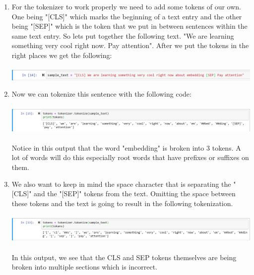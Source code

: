 \documentclass{article}
\begin{document}
\begin{enumerate}
    
    \item For the tokenizer to work properly we need to add some tokens of our own.  One being "[CLS]" which marks the beginning of a text entry and the other being "[SEP]" which is the token that we put in between sentences within the same text entry.  So lets put together the following text.  "We are learning something very cool right now. Pay attention". After we put the tokens in the right places we get the following:\\
    \vspace{.1cm}\\
    \includegraphics[scale = .7]{sample3.png}
    \vspace{.2cm}\\
    \item Now we can tokenize this sentence with the following code:\\
    \vspace{.1cm}\\
    \includegraphics[scale = .6]{tokenstep2.png}\\
    \vspace{.1cm}\\
    Notice in this output that the word "embedding" is broken into 3 tokens.  A lot of words will do this especially root words that have prefixes or suffixes on them.
    \vspace{.2cm}\\
    \item We also want to keep in mind the space character that is separating the "[CLS]" and the "[SEP]" tokens from the text. Omitting the space between these tokens and the text is going to result in the following tokenization.\\
    \vspace{.1cm}\\
    \includegraphics[scale = .6]{tokenstep1.png}\\
    \vspace{.1cm}\\
    In this output, we see that the CLS and SEP tokens themselves are being broken into multiple sections which is incorrect.
    

\end{enumerate}
\end{document}
